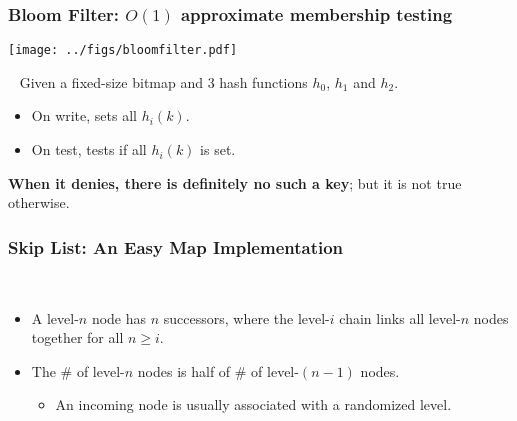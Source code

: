 \documentclass[lualatex]{beamer}
\renewcommand{\emph}{\textbf}
\begin{document}
\begin{frame}
  \frametitle{Bloom Filter: $O(1)$ approximate membership testing}
  \begin{center}
    \texttt{[image: ../figs/bloomfilter.pdf]}
  \end{center}
  \begin{block}{~}
    Given a fixed-size bitmap and 3 hash functions $h_0$, $h_1$ and $h_2$.
    \begin{itemize}
      \item On write, sets all $h_i(k)$.
      \item On test, tests if all $h_i(k)$ is set.
    \end{itemize}
    \emph{When it denies, there is definitely no such a key};
    but it is not true otherwise.
  \end{block}
\end{frame}

\begin{frame}
  \frametitle{Skip List: An Easy Map Implementation}
  \begin{center}
  \end{center}
  \begin{block}{~}
    \begin{itemize}
      \item A level-$n$ node has $n$ successors,
        where the level-$i$ chain links all level-$n$ nodes together for all $n\geqslant i$.
      \item The \# of level-$n$ nodes is half of \# of level-$(n-1)$ nodes.
        \begin{itemize}
          \item An incoming node is usually associated with a randomized level.
        \end{itemize}
    \end{itemize}
  \end{block}
\end{frame}
\end{document}

